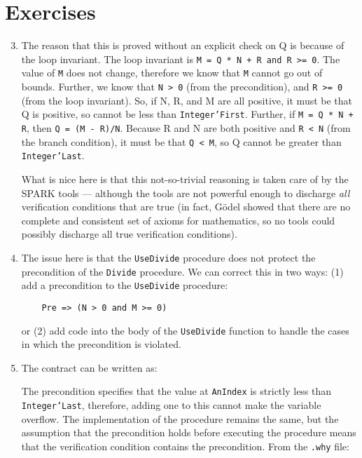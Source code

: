 \documentclass{article}
\def\rootdir{../}
\begin{document}
\lstset{language=Ada,aboveskip=3mm}


\section*{Exercises}

\begin{enumerate}

 \setcounter{enumi}{2}

 \item The reason that this is proved without an explicit check on Q is because of the loop invariant. The loop invariant is \texttt{M = Q * N + R and R >= 0}. The value of \texttt{M} does not change, therefore we know that \texttt{M} cannot go out of bounds. Further, we know that \texttt{N > 0} (from the precondition), and \texttt{R >= 0} (from the loop invariant). So, if N, R, and M are all positive, it must be that Q is positive, so cannot be less than \texttt{Integer'First}. Further, if \texttt{M = Q * N + R}, then \texttt{Q = (M - R)/N}. Because R and N are both positive and \texttt{R < N} (from the branch condition), it must be that \texttt{Q < M}, so Q cannot be greater than \texttt{Integer'Last}.

What is nice here is that this not-so-trivial reasoning is taken care of by the SPARK tools --- although the tools are not powerful enough to discharge \emph{all} verification conditions that are true (in fact, G\"odel showed that there are no complete and consistent set of axioms for mathematics, so no tools could possibly discharge all true verification conditions).

 \item The issue here is that the \texttt{UseDivide} procedure does not protect the precondition of the \texttt{Divide} procedure. We can correct this in two ways: (1) add a precondition to  the \texttt{UseDivide} procedure:

  \verb|    Pre => (N > 0 and M >= 0)|

or (2) add code into the body of the \texttt{UseDivide} function to handle the cases in which the precondition is violated.


 \item The contract can be written as:

 

  The precondition specifies that the value at \texttt{AnIndex} is strictly less than \texttt{Integer'Last}, therefore, adding one to this cannot make the variable overflow. The implementation of the procedure remains the same, but the assumption that the precondition holds before executing the procedure means that the verification condition contains the precondition. From the \texttt{.why} file:


\end{enumerate}
\end{document}
